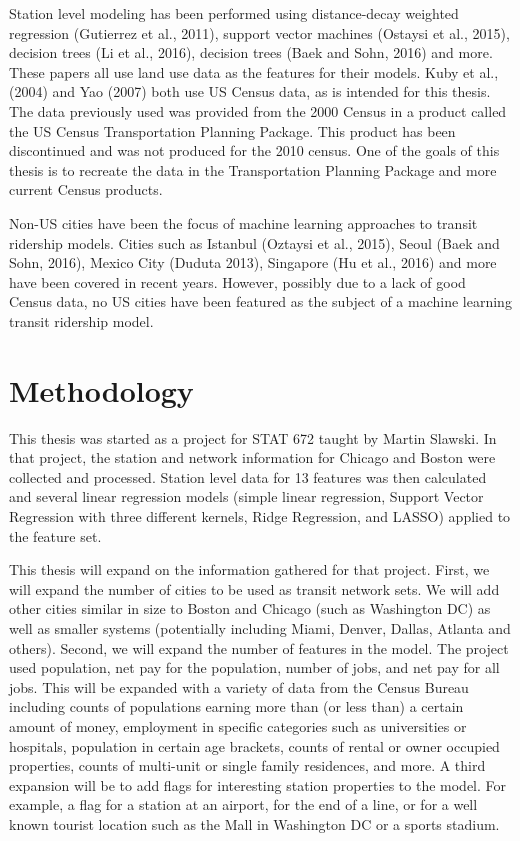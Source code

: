 \documentclass{article}
\begin{document}
Station level modeling has been performed using distance-decay weighted regression (Gutierrez et al., 2011), support vector machines (Ostaysi et al., 2015), decision trees (Li et al., 2016), decision trees (Baek and Sohn, 2016) and more. These papers all use land use data as the features for their models. Kuby et al., (2004) and Yao (2007) both use US Census data, as is intended for this thesis. The data previously used was provided from the 2000 Census in a product called the US Census Transportation Planning Package. This product has been discontinued and was not produced for the 2010 census. One of the goals of this thesis is to recreate the data in the Transportation Planning Package and more current Census products.

Non-US cities have been the focus of machine learning approaches to transit ridership models. Cities such as Istanbul (Oztaysi et al., 2015), Seoul (Baek and Sohn, 2016), Mexico City (Duduta 2013), Singapore (Hu et al., 2016) and more have been covered in recent years. However, possibly due to a lack of good Census  data, no US cities have been featured as the subject of a machine learning transit ridership model. 

\section{Methodology}

This thesis was started as a project for STAT 672 taught by Martin Slawski. In that project, the station and network information for Chicago and Boston were collected and processed. Station level data for 13 features was then calculated and several linear regression models (simple linear regression, Support Vector Regression with three different kernels, Ridge Regression, and LASSO) applied to the feature set. 

This thesis will expand on the information gathered for that project. First, we will expand the number of cities to be used as transit network sets. We will add other cities similar in size to Boston and Chicago (such as Washington DC) as well as smaller systems (potentially including Miami, Denver, Dallas, Atlanta and others). Second, we will expand the number of features in the model. The project used population, net pay for the population, number of jobs, and net pay for all jobs. This will be expanded with a variety of data from the Census Bureau including counts of populations earning more than (or less than) a certain amount of money, employment in specific categories such as universities or hospitals, population in certain age brackets, counts of rental or owner occupied properties, counts of multi-unit or single family residences, and more. A third expansion will be to add flags for interesting station properties to the model. For example, a flag for a station at an airport, for the end of a line, or for a well known tourist location such as the Mall in Washington DC or a sports stadium. 
\end{document}
